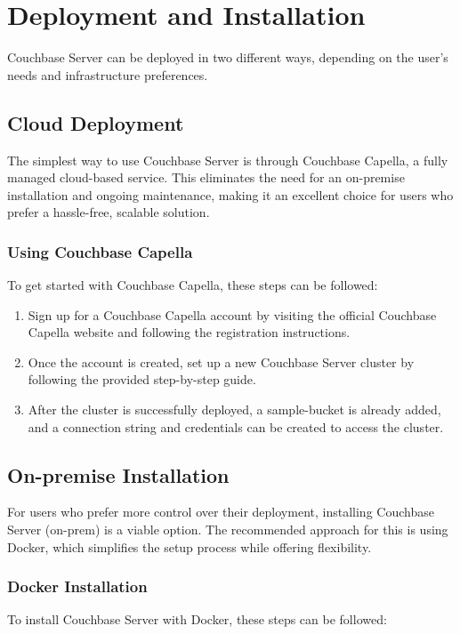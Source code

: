 \newpage
\chapter{Deployment and Installation}

Couchbase Server can be deployed in two different ways, depending on the user's needs and infrastructure preferences.

\section{Cloud Deployment}
The simplest way to use Couchbase Server is through Couchbase Capella, a fully managed cloud-based service. This eliminates the need for an on-premise installation and ongoing maintenance, making it an excellent choice for users who prefer a hassle-free, scalable solution.

\subsection{Using Couchbase Capella}
To get started with Couchbase Capella, these steps can be followed:

\begin{enumerate}
  \item Sign up for a Couchbase Capella account by visiting the official Couchbase Capella website and following the registration instructions. \cite{couchbaseCapellaSignUp}
  \item Once the account is created, set up a new Couchbase Server cluster by following the provided step-by-step guide.
  \item After the cluster is successfully deployed, a sample-bucket is already added, and a connection string and credentials can be created to access the cluster.
\end{enumerate}
\cite{couchbaseCapellaGettingStarted}

\section{On-premise Installation}
For users who prefer more control over their deployment, installing Couchbase Server (on-prem) is a viable option. The recommended approach for this is using Docker, which simplifies the setup process while offering flexibility.

\subsection{Docker Installation}
To install Couchbase Server with Docker, these steps can be followed:

